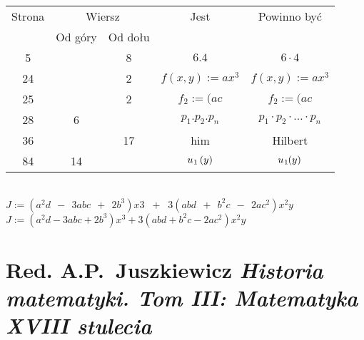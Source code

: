 \documentclass[a4paper,11pt]{article}
\numberwithin{equation}{section}
\begin{document}


\begin{center}

  \begin{tabular}{|c|c|c|c|c|}
    \hline
    Strona & \multicolumn{2}{c|}{Wiersz} & Jest
    & Powinno być \\ \cline{2-3}
    & Od góry & Od dołu & & \\
    \hline
    \hphantom{0}5 & & \hphantom{0}8 & $6.4$ & $6 \cdot 4$ \\
    24 & & \hphantom{0}2 & $f( x, y ) \!\! := \!\! a x^{ 3 }$
    & $f( x, y ) := a x^{ 3 }$ \\
    25 & & \hphantom{0}2 & $f_{ 2 } \!\! := \!\! ( a c$
    & $f_{ 2 } := ( a c$ \\
    28 & \hphantom{0}6 & & $p_{ 1 }.p_{ 2 }.p_{ n }$
    & $p_{ 1 } \cdot p_{ 2 } \cdot \ldots \cdot p_{ n }$ \\
    36 & & 17 & him & Hilbert \\
    84 & 14 & & $u_{ \hspace{0.05em} 1 } \, ( y )$
    & $u_{ \hspace{0.05em} 1 }\hspace{-0.05em}( y )$ \\

    \hline
  \end{tabular}

\end{center}

\VerSpaceTwo


\noindent
{} \\
\Jest $J \!\!
:= \!\! ( a^{ 2 } d \;\, - \;\, 3 a b c \;\, + \;\, 2 b^{ 3 }) \! x3 \;\; +
\;\; 3( a b d \;\, + \;\, b^{ 2 } c \;\, - \;\, 2 a c^{ 2 } ) x^{ 2 } y$
\\[0.3em]
\PowinnoByc $J := ( a^{ 2 } d - 3 a b c + 2 b^{ 3 } ) x^{ 3 } + 3 ( a b d +
b^{ 2 } c - 2 a c^{ 2 } ) x^{ 2 } y$











\newpage

\section{Red. A.P.~Juszkiewicz
  \textit{Historia matematyki. Tom III: Matematyka XVIII stulecia}
  \parencite{Red-Juszkiewicz-Historia-matematyki-Vol-III-Pub-1977}}
\end{document}
